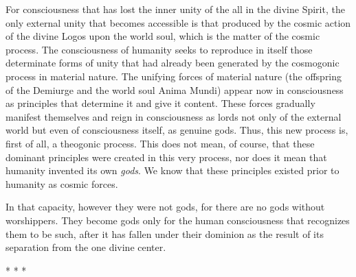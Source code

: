 \begin{quotationx}
For consciousness that has lost the inner unity of the all in the divine Spirit, the only external unity that becomes accessible is that produced by the cosmic action of the divine Logos upon the world soul, which is the matter of the cosmic process. The consciousness of humanity seeks to reproduce in itself those determinate forms of unity that had already been generated by the cosmogonic process in material nature. The unifying forces of material nature (the offspring of the Demiurge and the world soul Anima Mundi) appear now in consciousness as principles that determine it and give it content. These forces gradually manifest themselves and reign in consciousness as lords not only of the external world but even of consciousness itself, as genuine gods. Thus, this new process is, first of all, a theogonic process. This does not mean, of course, that these dominant principles were created in this very process, nor does it mean that humanity invented its own
\emph{gods}. We know that these principles existed prior to humanity as cosmic forces.

In that capacity, however they were not gods, for there are no gods without worshippers. They become gods only for the human consciousness that recognizes them to be such, after it has fallen under their dominion as the result of its separation from the one divine center.
\end{quotationx}




\begin{center}* * *\end{center}

